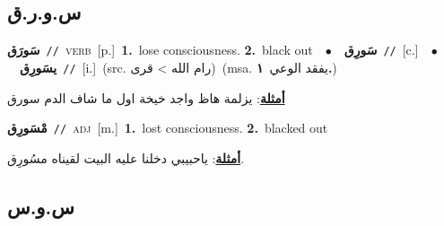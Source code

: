\documentclass[10pt,a4paper,twoside]{article} %
\begin{document}
\begin{multicols}{2}
\vspace{-3mm}
\subsection*{\color{blue}\foreignlanguage{arabic}{س.و.ر.ق}\color{blue}{}} 

{\setlength\topsep{0pt}\textbf{\foreignlanguage{arabic}{سَورَق}}\ {\color{gray}\texttt{//}\color{black}}\ \textsc{verb}\ [p.]\ \textbf{1.}~lose consciousness.  \textbf{2.}~black out\ \ $\bullet$\ \ \setlength\topsep{0pt}\textbf{\foreignlanguage{arabic}{سَورِق}}\ {\color{gray}\texttt{//}\color{black}}\ [c.]\ \ $\bullet$\ \ \setlength\topsep{0pt}\textbf{\foreignlanguage{arabic}{يسَورِق}}\ {\color{gray}\texttt{//}\color{black}}\ [i.]\ (src. \color{gray}\foreignlanguage{arabic}{رام الله > قرى}\color{black})\ \color{gray}(msa. \foreignlanguage{arabic}{يفقد الوعي}~\foreignlanguage{arabic}{\textbf{١.}})\color{black}\  \begin{flushright}\color{gray}\foreignlanguage{arabic}{\textbf{\underline{\foreignlanguage{arabic}{أمثلة}}}: يزلمة هاظ واجد خيخة اول ما شاف الدم سورق}\end{flushright}\color{black}} \vspace{2mm}

{\setlength\topsep{0pt}\textbf{\foreignlanguage{arabic}{مْسَورِق}}\ {\color{gray}\texttt{//}\color{black}}\ \textsc{adj}\ [m.]\ \textbf{1.}~lost consciousness.  \textbf{2.}~blacked out\  \begin{flushright}\color{gray}\foreignlanguage{arabic}{\textbf{\underline{\foreignlanguage{arabic}{أمثلة}}}: ياحبيبي دخلنا عليه البيت لقيناه مسُورِق.}\end{flushright}\color{black}} \vspace{2mm}

\vspace{-3mm}
\subsection*{\color{blue}\foreignlanguage{arabic}{س.و.س}\color{blue}{}} 


\end{multicols}
\end{document}
